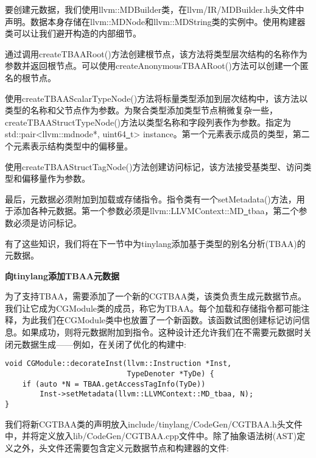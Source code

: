 要创建元数据，我们使用llvm::MDBuilder类，在llvm/IR/MDBuilder.h头文件中声明。数据本身存储在llvm::MDNode和llvm::MDString类的实例中。使用构建器类可以让我们避开构造的内部细节。\par

通过调用createTBAARoot()方法创建根节点，该方法将类型层次结构的名称作为参数并返回根节点。可以使用createAnonymousTBAARoot()方法可以创建一个匿名的根节点。\par

使用createTBAAScalarTypeNode()方法将标量类型添加到层次结构中，该方法以类型的名称和父节点作为参数。为聚合类型添加类型节点稍微复杂一些，createTBAAStructTypeNode()方法以类型名称和字段列表作为参数。指定为std::pair<llvm::mdnode*, uint64\underline{~}t> instance。第一个元素表示成员的类型，第二个元素表示结构类型中的偏移量。\par

使用createTBAAStructTagNode()方法创建访问标记，该方法接受基类型、访问类型和偏移量作为参数。\par

最后，元数据必须附加到加载或存储指令。指令类有一个setMetadata()方法，用于添加各种元数据。第一个参数必须是llvm::LLVMContext::MD\underline{~}tbaa，第二个参数必须是访问标记。\par

有了这些知识，我们将在下一节中为tinylang添加基于类型的别名分析(TBAA)的元数据。\par

\hspace*{\fill} \par %
\textbf{向tinylang添加TBAA元数据}

为了支持TBAA，需要添加了一个新的CGTBAA类，该类负责生成元数据节点。我们让它成为CGModule类的成员，称它为TBAA。每个加载和存储指令都可能注释，为此我们在CGModule类中也放置了一个新函数。该函数试图创建标记访问信息。如果成功，则将元数据附加到指令。这种设计还允许我们在不需要元数据时关闭元数据生成——例如，在关闭了优化的构建中:\par

\begin{lstlisting}[caption={}]
void CGModule::decorateInst(llvm::Instruction *Inst,
							TypeDenoter *TyDe) {
	if (auto *N = TBAA.getAccessTagInfo(TyDe))
		Inst->setMetadata(llvm::LLVMContext::MD_tbaa, N);
}
\end{lstlisting}

我们将新CGTBAA类的声明放入include/tinylang/CodeGen/CGTBAA.h头文件中，并将定义放入lib/CodeGen/CGTBAA.cpp文件中。除了抽象语法树(AST)定义之外，头文件还需要包含定义元数据节点和构建器的文件:\par


